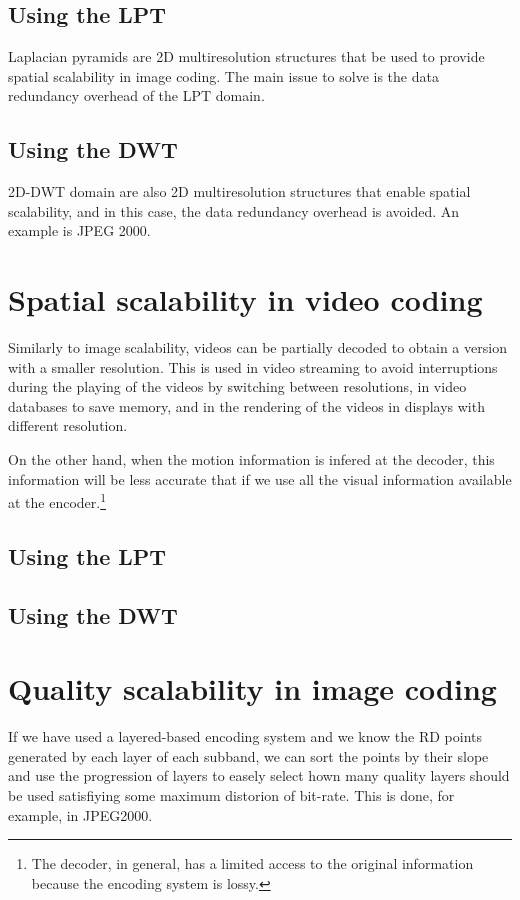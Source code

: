 \subsection{Using the LPT}

Laplacian pyramids are 2D multiresolution structures that be used to
provide spatial scalability in image coding. The main issue to solve
is the data redundancy overhead of the LPT domain.

\subsection{Using the DWT}

2D-DWT domain are also 2D multiresolution structures that enable
spatial scalability, and in this case, the data redundancy overhead is
avoided. An example is JPEG 2000.

\section{Spatial scalability in video coding}

Similarly to image scalability, videos can be partially decoded to
obtain a version with a smaller resolution. This is used in video
streaming to avoid interruptions during the playing of the videos by
switching between resolutions, in video databases to save memory, and
in the rendering of the videos in displays with different resolution.

On the other hand, when the motion information is infered at the
decoder, this information will be less accurate that if we use all the
visual information available at the encoder.\footnote{The decoder, in
general, has a limited access to the original information because the
encoding system is lossy.}

\subsection{Using the LPT}

\subsection{Using the DWT}

\section{Quality scalability in image coding}

If we have used a layered-based encoding system and we know the RD
points generated by each layer of each subband, we can sort the points
by their slope and use the progression of layers to easely select hown
many quality layers should be used satisfiying some maximum distorion
of bit-rate. This is done, for example, in JPEG2000.

